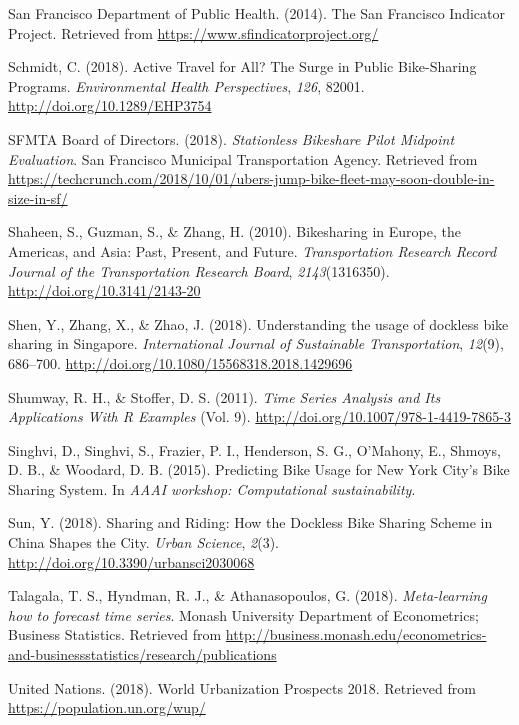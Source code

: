 \documentclass[12pt,oneside]{reedthesis}
\begin{document}
\hypertarget{ref-sfindicator}{}
San Francisco Department of Public Health. (2014). The San Francisco
Indicator Project. Retrieved from
\url{https://www.sfindicatorproject.org/}

\hypertarget{ref-schmidt2018}{}
Schmidt, C. (2018). Active Travel for All? The Surge in Public
Bike-Sharing Programs. \emph{Environmental Health Perspectives},
\emph{126}, 82001. \url{http://doi.org/10.1289/EHP3754}

\hypertarget{ref-sfmta2018three}{}
SFMTA Board of Directors. (2018). \emph{Stationless Bikeshare Pilot
Midpoint Evaluation}. San Francisco Municipal Transportation Agency.
Retrieved from
\url{https://techcrunch.com/2018/10/01/ubers-jump-bike-fleet-may-soon-double-in-size-in-sf/}

\hypertarget{ref-shaheen2010}{}
Shaheen, S., Guzman, S., \& Zhang, H. (2010). Bikesharing in Europe, the
Americas, and Asia: Past, Present, and Future. \emph{Transportation
Research Record Journal of the Transportation Research Board},
\emph{2143}(1316350). \url{http://doi.org/10.3141/2143-20}

\hypertarget{ref-shen2018}{}
Shen, Y., Zhang, X., \& Zhao, J. (2018). Understanding the usage of
dockless bike sharing in Singapore. \emph{International Journal of
Sustainable Transportation}, \emph{12}(9), 686--700.
\url{http://doi.org/10.1080/15568318.2018.1429696}

\hypertarget{ref-shumway2011}{}
Shumway, R. H., \& Stoffer, D. S. (2011). \emph{Time Series Analysis and
Its Applications With R Examples} (Vol. 9).
\url{http://doi.org/10.1007/978-1-4419-7865-3}

\hypertarget{ref-singhvi2015}{}
Singhvi, D., Singhvi, S., Frazier, P. I., Henderson, S. G., O'Mahony,
E., Shmoys, D. B., \& Woodard, D. B. (2015). Predicting Bike Usage for
New York City's Bike Sharing System. In \emph{AAAI workshop:
Computational sustainability}.

\hypertarget{ref-sun2018}{}
Sun, Y. (2018). Sharing and Riding: How the Dockless Bike Sharing Scheme
in China Shapes the City. \emph{Urban Science}, \emph{2}(3).
\url{http://doi.org/10.3390/urbansci2030068}

\hypertarget{ref-talagala2018}{}
Talagala, T. S., Hyndman, R. J., \& Athanasopoulos, G. (2018).
\emph{Meta-learning how to forecast time series}. Monash University
Department of Econometrics; Business Statistics. Retrieved from
\url{http://business.monash.edu/econometrics-and-businessstatistics/research/publications}

\hypertarget{ref-un2018}{}
United Nations. (2018). World Urbanization Prospects 2018. Retrieved
from \url{https://population.un.org/wup/}
\end{document}
